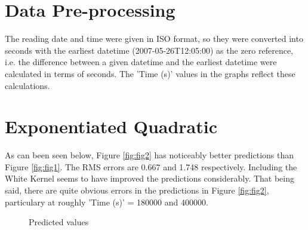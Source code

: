 \documentclass[11pt]{article}
\begin{document}
\section{Data Pre-processing}
The reading date and time were given in ISO format, so they were converted into seconds with the earliest datetime (2007-05-26T12:05:00) as the zero reference, i.e. the difference between a given datetime and the earliest datetime were calculated in terms of seconds. The 'Time (s)' values in the graphs reflect these calculations.

\section{Exponentiated Quadratic}
\label{sec:RBF}
As can been seen below, Figure \ref{fig:fig2} has noticeably better predictions than Figure \ref{fig:fig1}. The RMS errors are 0.667 and 1.748 respectively. Including the White Kernel seems to have improved the predictions considerably. That being said, there are quite obvious errors in the predictions in Figure \ref{fig:fig2}, particulary at roughly 'Time (s)' = 180000 and 400000.
 

\begin{figure}[!htb]
    \centering
      \hfill
    \hfill
    \caption{Predicted values}
  \end{figure}
  
\end{document}
